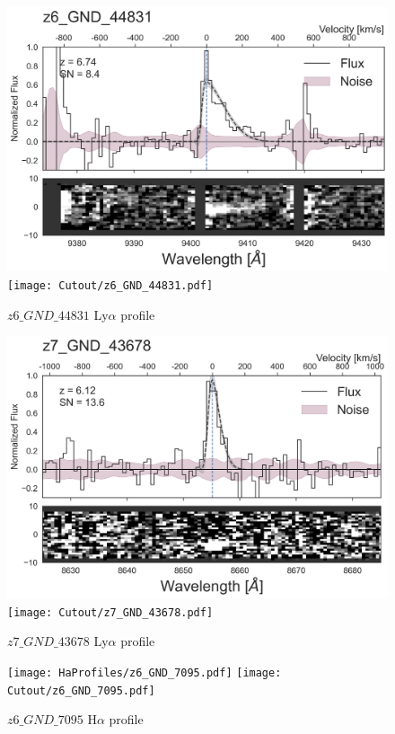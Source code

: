 \documentclass[12pt,english]{article}
\begin{document}
\begin{figure}
\begin{center}\includegraphics[width=12cm, trim=0.1cm 0cm 0cm -1cm]{LyaProfiles/z6_GND_44831.png}
\texttt{[image: Cutout/z6\_GND\_44831.pdf]}
\caption{$z6\_GND\_44831$ Ly$\alpha$ profile}
\end{center}
\end{figure}
\clearpage
\begin{figure}
\begin{center}\includegraphics[width=12cm, trim=0.1cm 0cm 0cm -1cm]{LyaProfiles/z7_GND_43678.png}
\texttt{[image: Cutout/z7\_GND\_43678.pdf]}
\caption{$z7\_GND\_43678$ Ly$\alpha$ profile}
\end{center}
\end{figure}
\clearpage
\begin{figure}
\begin{center}\texttt{[image: HaProfiles/z6\_GND\_7095.pdf]}
\texttt{[image: Cutout/z6\_GND\_7095.pdf]}
\caption{$z6\_GND\_7095$ H$\alpha$ profile}
\end{center}
\end{figure}
\end{document}
